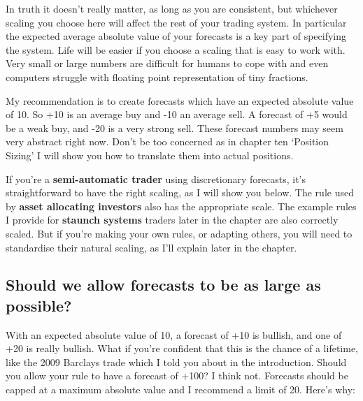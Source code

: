 In truth it doesn't really matter, as long as you are consistent, but whichever scaling you choose here will affect the rest of your trading system. In particular the expected average absolute value of your forecasts is a key part of specifying the system. Life will be easier if you choose a scaling that is easy to work with. Very small or large numbers are difficult for humans to cope with and even computers struggle with floating point representation of tiny fractions.

My recommendation is to create forecasts which have an expected absolute value of 10. So +10 is an average buy and -10 an average sell. A forecast of +5 would be a weak buy, and -20 is a very strong sell. These forecast numbers may seem very abstract right now. Don't be too concerned as in chapter ten ‘Position Sizing' I will show you how to translate them into actual positions.

If you're a \textbf{semi-automatic trader} using discretionary forecasts, it's straightforward to have the right scaling, as I will show you below. The rule used by \textbf{asset allocating investors} also has the appropriate scale. The example rules I provide for \textbf{staunch systems} traders later in the chapter are also correctly scaled. But if you're making your own rules, or adapting others, you will need to standardise their natural scaling, as I'll explain later in the chapter.

\subsection*{Should we allow forecasts to be as large as possible?}

With an expected absolute value of 10, a forecast of +10 is bullish, and one of +20 is really bullish. What if you're confident that this is the chance of a lifetime, like the 2009 Barclays trade which I told you about in the introduction. Should you allow your rule to have a forecast of +100? I think not. Forecasts should be capped at a maximum absolute value and I recommend a limit of 20. Here's why:


